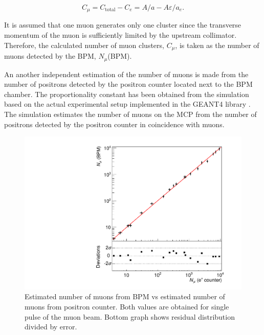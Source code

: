 \documentclass[preprint,3p,twocolumn]{elsarticle}
\begin{document}
\begin{linenomath}
\begin{equation}
C_{\mu} = C_{\text{total}} - C_{e}= A/a - A\varepsilon/a_e.
\end{equation}
\end{linenomath}

It is assumed that one muon generates only one cluster
since the transverse momentum of the muon is sufficiently limited
by the upstream collimator. Therefore, the calculated number of
muon clusters, $C_{\mu}$, is taken as the number of muons detected by the
BPM, $N_{\mu}$(BPM).%

An another independent estimation of the number of muons is made
from the number of positrons detected by the positron counter
located next to the BPM chamber. The proportionality constant has
been obtained from the simulation based on the actual
experimental setup implemented in the GEANT4 library
\cite{geant4}.  The simulation estimates the number of muons on
the MCP from the number of positrons detected by the positron
counter in coincidence with muons.

\begin{figure}[tbp]
	\centering
	\includegraphics[width=\columnwidth]{figure/lin.pdf}
        \caption{Estimated number of muons from BPM vs estimated
          number of muons from positron counter. Both values are obtained for single pulse of the muon beam. Bottom graph
          shows residual distribution divided by error.}
\label{fig:muvsmu}
\end{figure}
\end{document}
